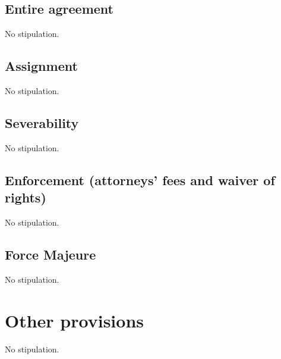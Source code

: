 \subsection{Entire agreement}

No stipulation.

\subsection{Assignment}

No stipulation.

\subsection{Severability}

No stipulation.


\subsection{Enforcement (attorneys' fees and waiver of rights)}

No stipulation.

\subsection{Force Majeure}

No stipulation.

\section{Other provisions}

No stipulation.

